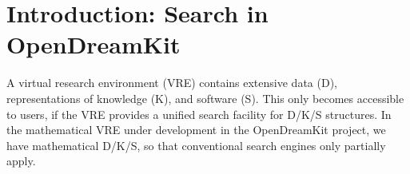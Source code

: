 \documentclass{deliverablereport}
\author{Michael Kohlhase \& Alexandru Glontaru}
\def\pn{OpenDreamKit\xspace}
\def\MWS{\textsf{MathWebSearch}\xspace}
\begin{document}
\maketitle\vfill
\begin{abstract}
  A virtual research environment (VRE) contains extensive data (D), representations of
  knowledge (K), and software (S). This only becomes accessible to users, if the VRE
  provides a unified search facility for D/K/S structures. In the mathematical VRE under
  development in the \pn project, we have mathematical D/K/S, so that conventional search
  engines only partially apply. 

  In this report, we present the \MWS engine, an open-source, open-format,
  content-oriented full-text search engine for mathematical formulae encoded in Content
  MathML. We eventually want to use it for searching notebooks, active documents and the
  Math-in-the-Middle Ontology in the \pn VRE. This report only presents the current system
  that can search mathematical documents written in {\LaTeX} or HTML5. 


 
 \end{abstract}
\vfill
\newpage\tableofcontents\newpage

\section{Introduction: Search in \pn}

A virtual research environment (VRE) contains extensive data (D), representations of
knowledge (K), and software (S). This only becomes accessible to users, if the VRE
provides a unified search facility for D/K/S structures. In the mathematical VRE under
development in the \pn project, we have mathematical D/K/S, so that conventional search
engines only partially apply. 
\end{document}
